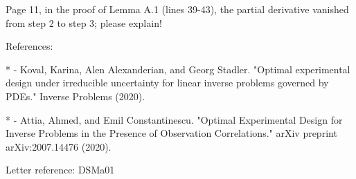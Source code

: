 \documentclass{amsart}
\begin{document}
Page 11, in the proof of Lemma A.1 (lines 39-43), the partial
derivative vanished from step 2 to step 3; please explain!

References:

* - Koval, Karina, Alen Alexanderian, and Georg
Stadler. "Optimal experimental design under irreducible uncertainty
for linear inverse problems governed by PDEs." Inverse Problems
(2020).

* - Attia, Ahmed, and Emil Constantinescu. "Optimal Experimental
Design for Inverse Problems in the Presence of Observation
Correlations." arXiv preprint arXiv:2007.14476 (2020).

Letter reference: DSMa01
\end{document}
